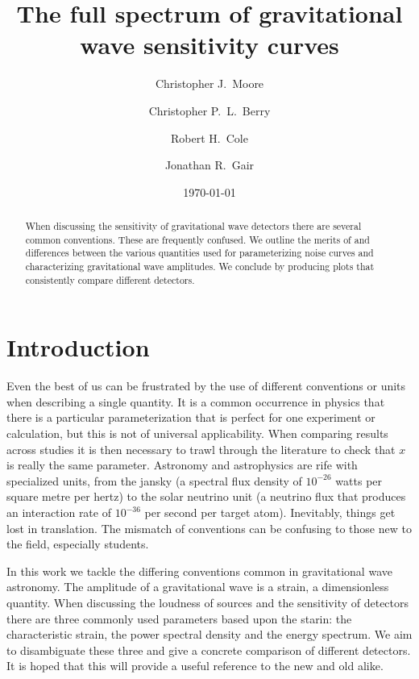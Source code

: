 \documentclass[prb,preprint]{revtex4-1}
\begin{document}
\title{The full spectrum of gravitational wave sensitivity curves}

\author{Christopher J.\ Moore}
\author{Christopher P.\ L.\ Berry}
\author{Robert H.\ Cole}
\author{Jonathan R.\ Gair}


\date{\today}

\begin{abstract}
When discussing the sensitivity of gravitational wave detectors there are several common conventions. These are frequently confused. We outline the merits of and differences between the various quantities used for parameterizing noise curves and characterizing gravitational wave amplitudes. We conclude by producing plots that consistently compare different detectors.
\end{abstract}

\maketitle

\section{Introduction} 


\noindent{}Even the best of us can be frustrated by the use of different conventions or units when describing a single quantity. It is a common occurrence in physics that  there is a particular parameterization that is perfect for one experiment or calculation, but this is not of universal applicability. When comparing results across studies it is then necessary to trawl through the literature to check that $x$ is really the same parameter. Astronomy and astrophysics are rife with specialized units, from the jansky (a spectral flux density of $10^{-26}$ watts per square metre per hertz) to the solar neutrino unit (a neutrino flux that produces an interaction rate of $10^{-36}$ per second per target atom). Inevitably, things get lost in translation. The mismatch of conventions can be confusing to those new to the field, especially students.

In this work we tackle the differing conventions common in gravitational wave astronomy. The amplitude of a gravitational wave is a strain, a dimensionless quantity. When discussing the loudness of sources and the sensitivity of detectors there are three commonly used parameters based upon the starin: the characteristic strain, the power spectral density and the energy spectrum. We aim to disambiguate these three and give a concrete comparison of different detectors. It is hoped that this will provide a useful reference to the new and old alike. 
\end{document}
